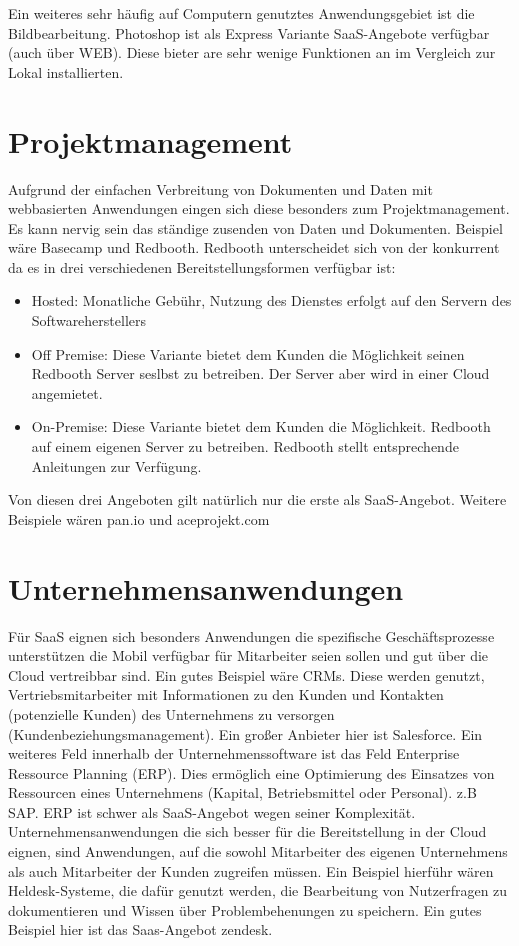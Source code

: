 \documentclass[a4paper,10pt]{article}
\begin{document}
\vspace{3mm}
Ein weiteres sehr häufig auf Computern genutztes Anwendungsgebiet ist die Bildbearbeitung. Photoshop ist als Express Variante SaaS-Angebote verfügbar (auch über WEB). Diese bieter are sehr wenige Funktionen an im Vergleich zur Lokal installierten.

\section{Projektmanagement}
Aufgrund der einfachen Verbreitung von Dokumenten und Daten mit webbasierten Anwendungen eingen sich diese besonders zum Projektmanagement. Es kann nervig sein das ständige zusenden von Daten und Dokumenten. Beispiel wäre Basecamp und Redbooth. Redbooth unterscheidet sich von der konkurrent da es in drei verschiedenen Bereitstellungsformen verfügbar ist:
\begin{itemize}
	\item Hosted: Monatliche Gebühr, Nutzung des Dienstes erfolgt auf den Servern des Softwareherstellers
	\item Off Premise: Diese Variante bietet dem Kunden die Möglichkeit seinen Redbooth Server seslbst zu betreiben. Der Server aber wird in einer Cloud angemietet.
	\item On-Premise: Diese Variante bietet dem Kunden die Möglichkeit. Redbooth auf einem eigenen Server zu betreiben. Redbooth stellt entsprechende Anleitungen zur Verfügung.
\end{itemize}
Von diesen drei Angeboten gilt natürlich nur die erste als SaaS-Angebot. Weitere Beispiele wären pan.io und aceprojekt.com

\section{Unternehmensanwendungen}

Für SaaS eignen sich besonders Anwendungen die spezifische Geschäftsprozesse unterstützen die Mobil verfügbar für Mitarbeiter seien sollen und gut über die Cloud vertreibbar sind. Ein gutes Beispiel wäre CRMs. Diese werden genutzt, Vertriebsmitarbeiter mit Informationen zu den Kunden und Kontakten (potenzielle Kunden) des Unternehmens zu versorgen (Kundenbeziehungsmanagement). Ein großer Anbieter hier ist Salesforce. Ein weiteres Feld innerhalb der Unternehmenssoftware ist das Feld Enterprise Ressource Planning (ERP). Dies ermöglich eine Optimierung des Einsatzes von Ressourcen eines Unternehmens (Kapital, Betriebsmittel oder Personal). z.B SAP. ERP ist schwer als SaaS-Angebot wegen seiner Komplexität. Unternehmensanwendungen die sich besser für die Bereitstellung in der Cloud eignen, sind Anwendungen, auf die sowohl Mitarbeiter des eigenen Unternehmens als auch Mitarbeiter der Kunden zugreifen müssen. Ein Beispiel hierführ wären Heldesk-Systeme, die dafür genutzt werden, die Bearbeitung von Nutzerfragen zu dokumentieren und Wissen über Problembehenungen zu speichern. Ein gutes Beispiel hier ist das Saas-Angebot zendesk.
\end{document}
